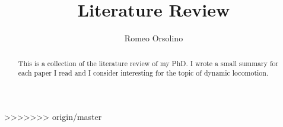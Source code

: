 \documentclass{article}
\begin{document}
\title{Literature Review}
\author{Romeo Orsolino}

\maketitle
\tableofcontents
\begin{abstract}
This is a collection of the literature review of my PhD. I wrote a small summary for each paper I read and I consider interesting for the topic of dynamic locomotion.
\end{abstract}






































>>>>>>> origin/master




\end{document}
